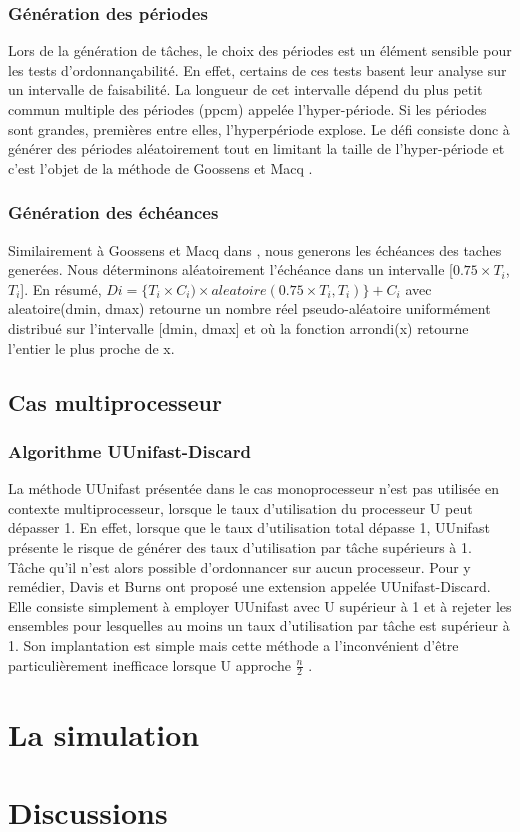 \subsubsection{Génération des périodes}
Lors de la génération de tâches, le choix des périodes est un élément sensible pour les tests
d’ordonnançabilité. En effet, certains de ces tests basent leur analyse sur un intervalle de faisabilité.
La longueur de cet intervalle dépend du plus petit commun multiple des périodes (ppcm)
appelée l’hyper-période. Si les périodes sont grandes, premières entre elles, l’hyperpériode
explose. Le défi consiste donc à générer des périodes aléatoirement tout en limitant
la taille de l’hyper-période et c’est l’objet de la méthode de Goossens et Macq \cite{Goossens01}. 
\subsubsection{Génération des échéances}
Similairement à Goossens et Macq dans \cite{Goossens01}, nous generons les échéances des taches generées. Nous déterminons
aléatoirement l’échéance dans un intervalle [$0.75 \times T_i$, $T_i$].
En résumé, $Di = \lbrace T_i \times C_i) \times aleatoire(0.75 \times T_i, T_i)\rbrace + C_i$ avec
aleatoire(dmin, dmax) retourne un nombre réel pseudo-aléatoire uniformément distribué sur l’intervalle [dmin, dmax] et où la fonction arrondi(x) retourne l’entier
le plus proche de x.
\subsection{Cas multiprocesseur}
\subsubsection{Algorithme UUnifast-Discard}
La méthode UUnifast présentée dans le cas monoprocesseur n’est pas utilisée en contexte
multiprocesseur, lorsque le taux d’utilisation du processeur U peut dépasser 1. En effet, lorsque
que le taux d’utilisation total dépasse 1, UUnifast présente le risque de générer des taux d’utilisation
par tâche supérieurs à 1. Tâche qu’il n’est alors possible d’ordonnancer sur aucun processeur.
Pour y remédier, Davis et Burns \cite{DB11} ont proposé une extension appelée UUnifast-Discard. Elle
consiste simplement à employer UUnifast avec U supérieur à 1 et à rejeter les ensembles pour
lesquelles au moins un taux d’utilisation par tâche est supérieur à 1. Son implantation est simple
mais cette méthode a l’inconvénient d’être particulièrement inefficace lorsque U approche $\frac{n}{2}$ \cite{Emb10}.
\section{La simulation}
\section{Discussions}